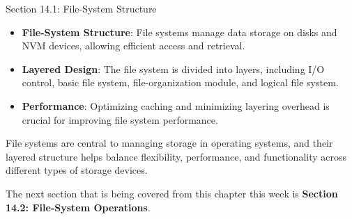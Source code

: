 \begin{notes}{Section 14.1: File-System Structure}
\begin{highlight}
    \end{highlight}
    
    \begin{highlight}
    
        \begin{itemize}
            \item \textbf{File-System Structure}: File systems manage data storage on disks and NVM devices, allowing efficient access and retrieval.
            \item \textbf{Layered Design}: The file system is divided into layers, including I/O control, basic file system, file-organization module, and logical file system.
            \item \textbf{Performance}: Optimizing caching and minimizing layering overhead is crucial for improving file system performance.
        \end{itemize}
    
    File systems are central to managing storage in operating systems, and their layered structure helps balance flexibility, performance, and functionality across different types of storage devices.
    
    \end{highlight}
\end{notes}

The next section that is being covered from this chapter this week is \textbf{Section 14.2: File-System Operations}.

